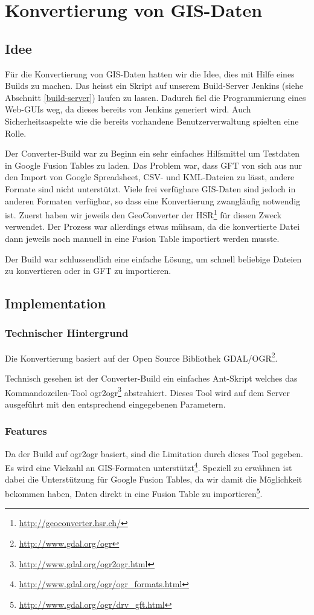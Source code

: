 \chapter{Konvertierung von GIS-Daten}
\label{converter-build}

\section{Idee}
Für die Konvertierung von GIS-Daten hatten wir die Idee, dies mit Hilfe eines Builds zu machen. Das heisst ein Skript auf unserem Build-Server Jenkins (siehe Abschnitt \ref{build-server}) laufen zu lassen. Dadurch fiel die Programmierung eines Web-GUIs weg, da dieses bereits von Jenkins generiert wird. Auch Sicherheitsaspekte wie die bereits vorhandene Benutzerverwaltung spielten eine Rolle.

Der Converter-Build war zu Beginn ein sehr einfaches Hilfsmittel um Testdaten in Google Fusion Tables zu laden. Das Problem war, dass GFT von sich aus nur den Import von Google Spreadsheet, \gls{CSV}- und \gls{KML}-Dateien zu lässt, andere Formate sind nicht unterstützt. Viele frei verfügbare \gls{GIS}-Daten sind jedoch in anderen Formaten verfügbar, so dass eine Konvertierung zwangläufig notwendig ist. Zuerst haben wir jeweils den GeoConverter der HSR\footnote{\url{http://geoconverter.hsr.ch/}} für diesen Zweck verwendet. Der Prozess war allerdings etwas mühsam, da die konvertierte Datei dann jeweils noch manuell in eine Fusion Table importiert werden musste.

Der Build war schlussendlich eine einfache Lösung, um schnell beliebige Dateien zu konvertieren oder in GFT zu importieren.

\section{Implementation}
\subsection{Technischer Hintergrund}
Die Konvertierung basiert auf der Open Source Bibliothek GDAL/OGR\footnote{\url{http://www.gdal.org/ogr}}.

Technisch gesehen ist der Converter-Build ein einfaches Ant-Skript welches das Kommandozeilen-Tool ogr2ogr\footnote{\url{http://www.gdal.org/ogr2ogr.html}} abstrahiert. Dieses Tool wird auf dem Server ausgeführt mit den entsprechend eingegebenen Parametern. 

\subsection{Features}
Da der Build auf ogr2ogr basiert, sind die Limitation durch dieses Tool gegeben. Es wird eine Vielzahl an \gls{GIS}-Formaten unterstützt\footnote{\url{http://www.gdal.org/ogr/ogr_formats.html}}. Speziell zu erwähnen ist dabei die Unterstützung für Google Fusion Tables, da wir damit die Möglichkeit bekommen haben, Daten direkt in eine Fusion Table zu importieren\footnote{\url{http://www.gdal.org/ogr/drv_gft.html}}.

